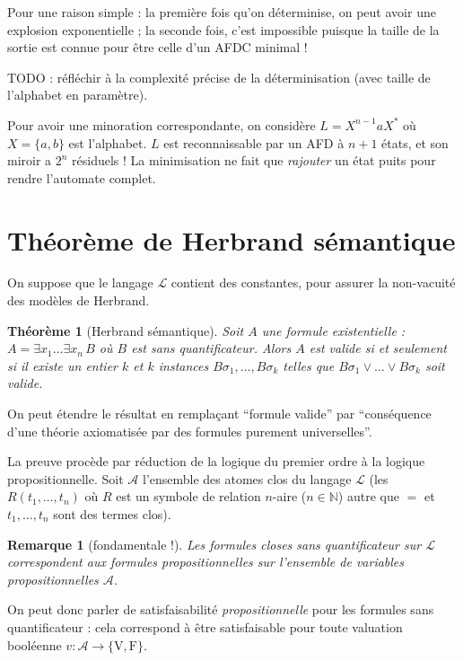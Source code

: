 \documentclass[a4paper, 11pt]{article}
\newtheorem*{theorem}{Théorème}
\newtheorem*{remark}{Remarque}
\begin{document}
Pour une raison simple : la première fois qu'on déterminise, on peut avoir une
explosion exponentielle ; la seconde fois, c'est impossible puisque la taille de
la sortie est connue pour être celle d'un AFDC minimal !

TODO : réfléchir à la complexité précise de la déterminisation (avec taille de
l'alphabet en paramètre).

Pour avoir une minoration correspondante, on considère $L = X^{n-1}aX^*$ où $X =
\{a,b\}$ est l'alphabet. $L$ est reconnaissable par un AFD à $n+1$ états, et son
miroir a $2^n$ résiduels ! La minimisation ne fait que \emph{rajouter} un état
puits pour rendre l'automate complet.

\newpage

\section{Théorème de Herbrand sémantique}

On suppose que le langage $\mathcal{L}$ contient des constantes, pour assurer la non-vacuité
des modèles de Herbrand.

\begin{theorem}[Herbrand sémantique]
  Soit $A$ une formule existentielle : $A = \exists x_1 \ldots \exists x_n\,B$
  où $B$ est sans quantificateur. Alors $A$ est valide si et seulement si il
  existe un entier $k$ et $k$ instances $B\sigma_1, \ldots, B\sigma_k$ telles
  que $B\sigma_1 \lor \ldots \lor B\sigma_k$ soit valide.
\end{theorem}

On peut étendre le résultat en remplaçant \enquote{formule valide} par
\enquote{conséquence d'une théorie axiomatisée par des formules purement
  universelles}.

La preuve procède par réduction de la logique du premier ordre à la logique
propositionnelle. Soit $\mathcal{A}$ l'ensemble des atomes clos du langage
$\mathcal{L}$ (les $R(t_1, \ldots, t_n)$ où $R$ est un symbole de relation
$n$-aire ($n \in \mathbb{N}$) autre que $=$ et $t_1, \ldots, t_n$ sont des
termes clos).

\begin{remark}[fondamentale !]
  Les formules closes sans quantificateur sur $\mathcal{L}$ correspondent aux
  formules propositionnelles sur l'ensemble de variables propositionnelles
  $\mathcal{A}$.
\end{remark}

On peut donc parler de satisfaisabilité \emph{propositionnelle} pour les
formules sans quantificateur : cela correspond à être satisfaisable pour toute
valuation booléenne $v : \mathcal{A} \to \{\mathrm{V}, \mathrm{F}\}$.
\end{document}
